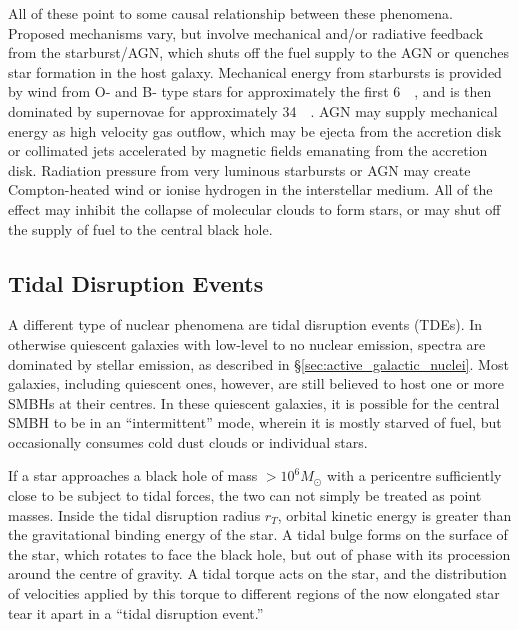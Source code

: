 \documentclass[a4paper,11pt]{article}
\begin{document}
All of these point to some causal relationship between these phenomena. Proposed mechanisms vary, but involve mechanical and/or radiative feedback from the starburst/AGN, which shuts off the fuel supply to the AGN or quenches star formation in the host galaxy. Mechanical energy from starbursts is provided by wind from O- and B- type stars for approximately the first \SI{6}{\mega\year}, and is then dominated by supernovae for approximately \SI{34}{\mega\year}. AGN may supply mechanical energy as high velocity gas outflow, which may be ejecta from the accretion disk or collimated jets accelerated by magnetic fields emanating from the accretion disk. Radiation pressure from very luminous starbursts or AGN may create Compton-heated wind or ionise hydrogen in the interstellar medium. All of the effect may inhibit the collapse of molecular clouds to form stars, or may shut off the supply of fuel to the central black hole.\cite{Veilleux_2008}


\subsection{Tidal Disruption Events}\label{sec:tidal_disruption_events}

A different type of nuclear phenomena are tidal disruption events (TDEs). In otherwise quiescent galaxies with low-level to no nuclear emission, spectra are dominated by stellar emission, as described in \S \ref{sec:active_galactic_nuclei}. Most galaxies, including quiescent ones, however, are still believed to host one or more SMBHs at their centres.\cite{Rees_1988} In these quiescent galaxies, it is possible for the central SMBH to be in an ``intermittent'' mode, wherein it is mostly starved of fuel, but occasionally consumes cold dust clouds or individual stars.\cite{Holoien_2016a, Rees_1988, Evans_1989}

If a star approaches a black hole of mass $>10^6M_\odot$ with a pericentre sufficiently close to be subject to tidal forces, the two can not simply be treated as point masses. Inside the tidal disruption radius $r_T$, orbital kinetic energy is greater than the gravitational binding energy of the star. A tidal bulge forms on the surface of the star, which rotates to face the black hole, but out of phase with its procession around the centre of gravity. A tidal torque acts on the star, and the distribution of velocities applied by this torque to different regions of the now elongated star tear it apart in a ``tidal disruption event.''\cite{Rees_1988, Evans_1989}
\end{document}
